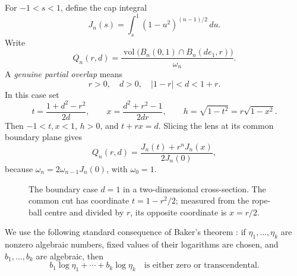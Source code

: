 \documentclass[11pt,a4paper]{article}
\numberwithin{equation}{section}
\theoremstyle{definition}
\theoremstyle{remark}
\newcommand{\vol}{\operatorname{vol}}
\begin{document}
For $-1<s<1$, define the cap integral
\begin{equation}\label{eq:cap}
 J_n(s)=\int_s^1(1-u^2)^{(n-1)/2}\,du.
\end{equation}
Write
\[
 Q_n(r,d)=\frac{\vol\bigl(B_n(0,1)\cap B_n(de_1,r)\bigr)}{\omega_n}.
\]
A \emph{genuine partial overlap} means
\begin{equation}\label{eq:partial}
 r>0,\quad d>0,\quad |1-r|<d<1+r.
\end{equation}
In this case set
\begin{equation}\label{eq:cuts}
 t=\frac{1+d^2-r^2}{2d},\qquad
 x=\frac{d^2+r^2-1}{2dr},\qquad
 h=\sqrt{1-t^2}=r\sqrt{1-x^2}.
\end{equation}
Then $-1<t,x<1$, $h>0$, and $t+rx=d$. Slicing the lens at its common boundary plane gives
\begin{equation}\label{eq:lens}
 Q_n(r,d)=\frac{J_n(t)+r^nJ_n(x)}{2J_n(0)},
\end{equation}
because $\omega_n=2\omega_{n-1}J_n(0)$, with $\omega_0=1$.

\begin{figure}[ht]
\centering
{}
\caption{The boundary case $d=1$ in a two-dimensional cross-section. The common cut has coordinate $t=1-r^2/2$; measured from the rope-ball centre and divided by $r$, its opposite coordinate is $x=r/2$.}
\label{fig:lens}
\end{figure}

We use the following standard consequence of Baker's theorem \cite{Baker}: if $\eta_1,\ldots,\eta_k$ are nonzero algebraic numbers, fixed values of their logarithms are chosen, and $b_1,\ldots,b_k$ are algebraic, then
\begin{equation}\label{eq:baker}
 b_1\log\eta_1+\cdots+b_k\log\eta_k
 \quad\text{is either zero or transcendental.}
\end{equation}
\end{document}

